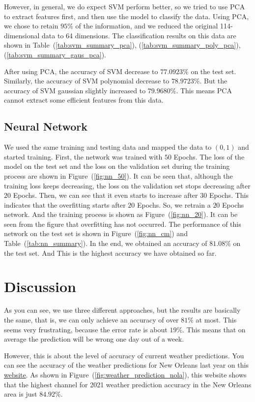 \documentclass[11pt, a4paper, jou]{apa7}
\begin{document}
    However, in general, we do expect SVM perform better, so we tried to use PCA to extract features first, and then use the model to classify the data. Using PCA, we chose to retain $95\%$ of the information, and we reduced the original 114-dimensional data to 64 dimensions. The classification results on this data are shown in Table~(\ref{tab:svm_summary_pca}), (\ref{tab:svm_summary_poly_pca}), (\ref{tab:svm_summary_gaus_pca}). 

    After using PCA, the accuracy of SVM decrease to $77.0923\%$ on the test set. Similarly, the accuracy of SVM polynomial decrease to $78.9723\%$. But the accuracy of SVM gaussian slightly increased to $79.9680\%$. This means PCA cannot extract some efficient features from this data.

\subsection{Neural Network}
We used the same training and testing data and mapped the data to $(0,1)$ and started training. First, the network was trained with $50$ Epochs. The loss of the model on the test set and the loss on the validation set during the training process are shown in Figure~(\ref{fig:nn_50}). It can be seen that, although the training loss keeps decreasing, the loss on the validation set stops decreasing after $20$ Epochs. Then, we can see that it even starts to increase after $30$ Epochs. This indicates that the overfitting starts after $20$ Epochs. So, we retrain a $20$ Epochs network. And the training process is shown as Figure~(\ref{fig:nn_20}). It can be seen from the figure that overfitting has not occurred. The performance of this network on the test set is shown in Figure~(\ref{fig:nn_cm}) and Table~(\ref{tab:nn_summary}). In the end, we obtained an accuracy of $81.08\%$ on the test set. And This is the highest accuracy we have obtained so far.

\section{Discussion}

As you can see, we use three different approaches, but the results are basically the same, that is, we can only achieve an accuracy of over $81\%$ at most. This seems very frustrating, because the error rate is about $19\%$. This means that on average the prediction will be wrong one day out of a week. 

However, this is about the level of accuracy of current weather predictions. You can see the accuracy of the weather predictions for New Orleans last year on this \href{https://www.forecastadvisor.com/Louisiana/NewOrleans/70112/}{website}. As shown in Figure~(\ref{fig:weather_prediction_nola}), this website shows that the highest channel for 2021 weather prediction accuracy in the New Orleans area is just $84.92\%$. 
\end{document}

